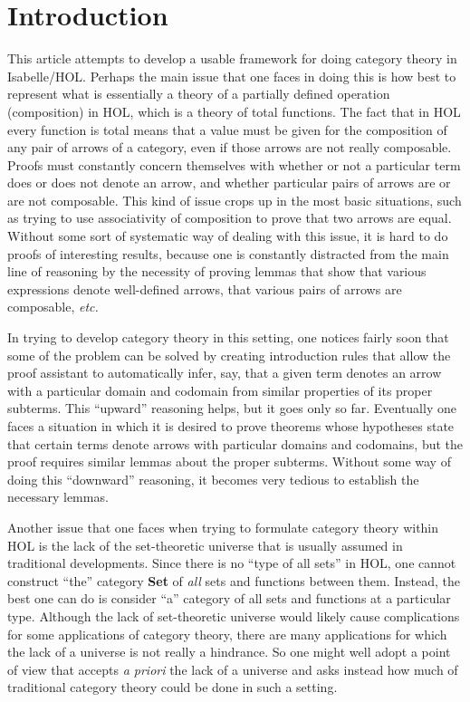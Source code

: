 \documentclass[11pt,notitlepage,a4paper]{report}
\begin{document}
\tableofcontents

\chapter{Introduction}

This article attempts to develop a usable framework for doing category theory in Isabelle/HOL.
Perhaps the main issue that one faces in doing this is how best to represent what is
essentially a theory of a partially defined operation (composition) in HOL, which is a theory
of total functions.  The fact that in HOL every function is total means that a value must be
given for the composition of any pair of arrows of a category, even if those arrows are not
really composable.  Proofs must constantly concern themselves with whether or not a
particular term does or does not denote an arrow, and whether particular pairs of arrows
are or are not composable.  This kind of issue crops up in the most basic situations,
such as trying to use associativity of composition to prove that two arrows are equal.
Without some sort of systematic way of dealing with this issue, it is hard to do proofs
of interesting results, because one is constantly distracted from the main line of
reasoning by the necessity of proving lemmas that show that various expressions denote
well-defined arrows, that various pairs of arrows are composable, {\em etc.}

In trying to develop category theory in this setting, one notices fairly soon that some
of the problem can be solved by creating introduction rules that allow the proof assistant
to automatically infer, say, that a given term denotes an arrow with a particular
domain and codomain from similar properties of its proper subterms.  This ``upward''
reasoning helps, but it goes only so far.  Eventually one faces a situation in which it is
desired to prove theorems whose hypotheses state that certain terms denote arrows with
particular domains and codomains, but the proof requires similar lemmas about the proper
subterms.  Without some way of doing this ``downward'' reasoning, it becomes very
tedious to establish the necessary lemmas.

Another issue that one faces when trying to formulate category theory within HOL
is the lack of the set-theoretic universe that is usually assumed in traditional
developments.  Since there is no ``type of all sets'' in HOL, one cannot construct
``the'' category {\bf Set} of {\em all} sets and functions between them.
Instead, the best one can do is consider ``a'' category of all sets and functions at
a particular type.  Although the lack of set-theoretic universe would likely cause
complications for some applications of category theory, there are many
applications for which the lack of a universe is not really a hindrance.
So one might well adopt a point of view that accepts {\em a priori} the lack of a
universe and asks instead how much of traditional category theory could be done in
such a setting.
\end{document}
